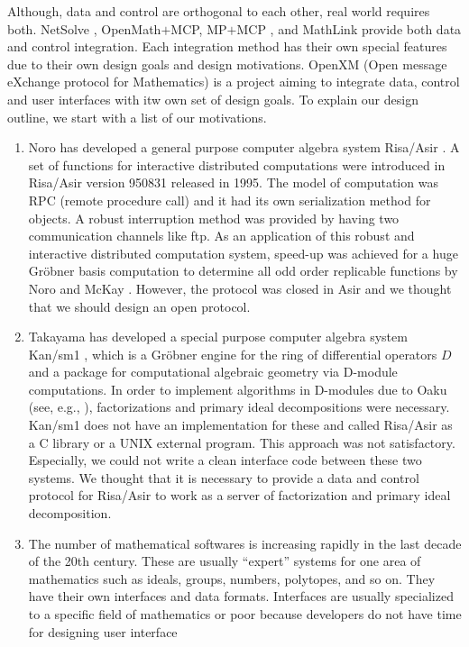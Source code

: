 Although, data and control are orthogonal to each other,
real world requires both.
NetSolve \cite{netsolve}, OpenMath$+$MCP, MP$+$MCP \cite{iamc},
and MathLink \cite{mathlink} provide both data and control integration.
Each integration method has their own special features due to their
own design goals and design motivations.
OpenXM (Open message eXchange protocol for Mathematics)
is a project aiming to integrate data, control and user interfaces
with itw own set of design goals.
To explain our design outline, we start with a list of
our motivations.
\begin{enumerate}
\item Noro has developed a general
purpose computer algebra system Risa/Asir \cite{asir}.
A set of functions for interactive distributed computations were introduced
in Risa/Asir version 950831 released in 1995.
The model of computation was RPC (remote procedure call)
and it had its own serialization method for objects.
A robust interruption method was provided by having two communication channels
like ftp.
As an application of this robust and interactive distributed computation
system, speed-up was achieved for a huge Gr\"obner basis computation
to determine all odd order replicable functions 
by Noro and McKay \cite{noro-mckay}.
However, the protocol was closed in Asir and we thought that we should
design an open protocol.
\item Takayama has developed
a special purpose computer algebra system Kan/sm1 \cite{kan},
which is a Gr\"obner engine for the ring of differential operators $D$ and
a package for computational algebraic geometry via D-module computations.
In order to implement algorithms in D-modules due to Oaku 
(see, e.g., \cite{sst-book}),
factorizations and primary ideal decompositions were necessary.
Kan/sm1 does not have an implementation for these and called
Risa/Asir as a C library or a UNIX external program.
This approach was not satisfactory.
Especially, we could not write a clean interface code between these
two systems.
We thought that it is necessary to provide a data and control protocol
for Risa/Asir to work as a server of factorization and primary ideal
decomposition.
\item The number of mathematical softwares is increasing rapidly in the last
decade of the 20th century.
These are usually ``expert'' systems for one area of mathematics
such as ideals, groups, numbers, polytopes, and so on.
They have their own interfaces and data formats.
Interfaces are usually specialized to a specific field of mathematics
or poor because developers do not have time for designing user interface

\end{enumerate}
